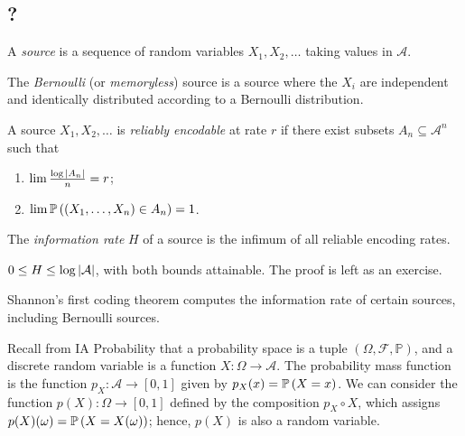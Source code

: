 \subsection{?}
\begin{definition}
    A \emph{source} is a sequence of random variables \( X_1, X_2, \dots \) taking values in \( \mathcal A \).
\end{definition}
\begin{example}
    The \emph{Bernoulli} (or \emph{memoryless}) source is a source where the \( X_i \) are independent and identically distributed according to a Bernoulli distribution.
\end{example}
\begin{definition}
    A source \( X_1, X_2, \dots \) is \emph{reliably encodable} at rate \( r \) if there exist subsets \( A_n \subseteq \mathcal A^n \) such that
    \begin{enumerate}
        \item \( \lim \frac{\log \abs{A_n}}{n} = r \);
        \item \( \lim \mathbb{P}\left({(X_1, \dots, X_n) \in A_n}\right) = 1 \).
    \end{enumerate}
\end{definition}
\begin{definition}
    The \emph{information rate} \( H \) of a source is the infimum of all reliable encoding rates.
\end{definition}
\begin{example}
    \( 0 \leq H \leq \log\abs{\mathcal A} \), with both bounds attainable.
    The proof is left as an exercise.
\end{example}
Shannon's first coding theorem computes the information rate of certain sources, including Bernoulli sources.

Recall from IA Probability that a probability space is a tuple \( (\Omega, \mathcal F, \mathbb P) \), and a discrete random variable is a function \( X \colon \Omega \to \mathcal A \).
The probability mass function is the function \( p_X \colon \mathcal A \to [0,1] \) given by \( p_X(x) = \mathbb{P}\left({X = x}\right) \).
We can consider the function \( p(X) \colon \Omega \to [0,1] \) defined by the composition \( p_X \circ X \), which assigns \( p(X)(\omega) = \mathbb{P}\left({X = X(\omega)}\right) \); hence, \( p(X) \) is also a random variable.

